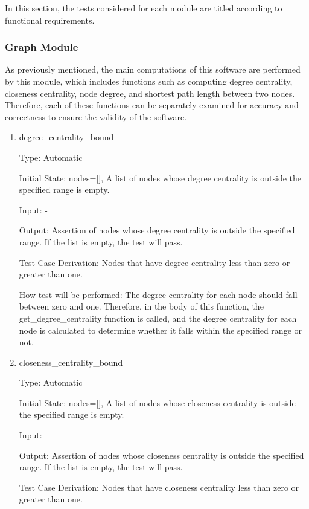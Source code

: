 \documentclass[12pt, titlepage]{article}
\begin{document}
In this section, the tests considered for each module are titled according to functional requirements.

\subsubsection{Graph Module}

As previously mentioned, the main computations of this software are performed by this module, which includes functions such as computing degree centrality, closeness centrality, node degree, and shortest path length between two nodes. Therefore, each of these functions can be separately examined for accuracy and correctness to ensure the validity of the software.

\begin{enumerate}

\item{degree\_centrality\_bound\\}

Type: Automatic
					
Initial State: nodes=[], A list of nodes whose degree centrality is outside the specified range is empty.
					
Input: -
					
Output: Assertion of nodes whose degree centrality is outside the specified range. If the list is empty, the test will pass.

Test Case Derivation: Nodes that have degree centrality less than zero or greater than one.

How test will be performed: The degree centrality for each node should fall between zero and one. Therefore, in the body of this function, the {get\_degree\_centrality} function is called, and the degree centrality for each node is calculated to determine whether it falls within the specified range or not.
					
\item{closeness\_centrality\_bound\\}

Type:  Automatic
					
Initial State: nodes=[], A list of nodes whose closeness centrality is outside the specified range is empty.
					
Input: -
					
Output: Assertion of nodes whose closeness centrality is outside the specified range. If the list is empty, the test will pass.

Test Case Derivation: Nodes that have closeness centrality less than zero or greater than one.


\end{enumerate}
\end{document}
